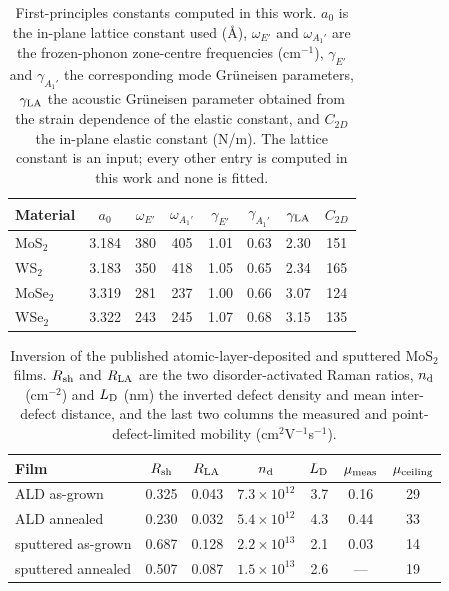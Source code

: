 \begin{table}[t]
\caption{First-principles constants computed in this work. $a_0$ is the
in-plane lattice constant used (\AA), $\omega_{E'}$ and $\omega_{A_1'}$ are the
frozen-phonon zone-centre frequencies (cm$^{-1}$), $\gamma_{E'}$ and
$\gamma_{A_1'}$ the corresponding mode Gr\"uneisen parameters,
$\gamma_{\rm LA}$ the acoustic Gr\"uneisen parameter obtained from the strain
dependence of the elastic constant, and $C_{2D}$ the in-plane elastic constant
(N/m).  The lattice constant is an input; every other entry is computed in
this work and none is fitted.}
\label{tab:dft}
\begin{ruledtabular}
\begin{tabular}{lccccccc}
Material & $a_0$ & $\omega_{E'}$ & $\omega_{A_1'}$ & $\gamma_{E'}$ &
$\gamma_{A_1'}$ & $\gamma_{\rm LA}$ & $C_{2D}$ \\
\hline
MoS$_2$ & 3.184 & 380 & 405 & 1.01 & 0.63 & 2.30 & 151 \\
WS$_2$ & 3.183 & 350 & 418 & 1.05 & 0.65 & 2.34 & 165 \\
MoSe$_2$ & 3.319 & 281 & 237 & 1.00 & 0.66 & 3.07 & 124 \\
WSe$_2$ & 3.322 & 243 & 245 & 1.07 & 0.68 & 3.15 & 135 \\
\end{tabular}
\end{ruledtabular}
\end{table}

\begin{table}[t]
\caption{Inversion of the published atomic-layer-deposited and sputtered
MoS$_2$ films. $R_{\rm sh}$ and $R_{\rm LA}$ are the two disorder-activated
Raman ratios, $n_{\rm d}$ (cm$^{-2}$) and $L_{\rm D}$ (nm) the inverted defect
density and mean inter-defect distance, and the last two columns the measured
and point-defect-limited mobility (cm$^2$V$^{-1}$s$^{-1}$).}
\label{tab:nattoo}
\begin{ruledtabular}
\begin{tabular}{lcccccc}
Film & $R_{\rm sh}$ & $R_{\rm LA}$ & $n_{\rm d}$ & $L_{\rm D}$ &
$\mu_{\rm meas}$ & $\mu_{\rm ceiling}$ \\
\hline
ALD as-grown & 0.325 & 0.043 & $7.3\times10^{12}$ & 3.7 & 0.16 & 29 \\
ALD annealed & 0.230 & 0.032 & $5.4\times10^{12}$ & 4.3 & 0.44 & 33 \\
sputtered as-grown & 0.687 & 0.128 & $2.2\times10^{13}$ & 2.1 & 0.03 & 14 \\
sputtered annealed & 0.507 & 0.087 & $1.5\times10^{13}$ & 2.6 & --- & 19 \\
\end{tabular}
\end{ruledtabular}
\end{table}

